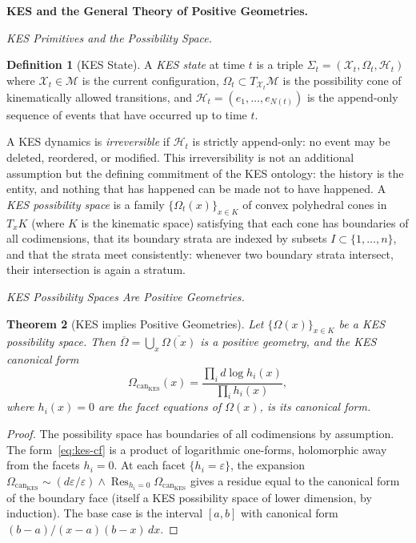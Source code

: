 \documentclass[12pt, oneside]{amsart}
\theoremstyle{plain}
\newtheorem{theorem}{Theorem}[section]
\theoremstyle{definition}
\newtheorem{definition}[theorem]{Definition}
\theoremstyle{remark}
\DeclareMathOperator{\Res}{Res}
\newcommand{\eps}{\varepsilon}
\newcommand{\XKS}{\mathcal{X}}
\newcommand{\OmKS}{\Omega}
\newcommand{\HKS}{\mathcal{H}}
\newcommand{\CF}{\Omega_{\mathrm{can}}}
\begin{document}
\bigskip\noindent\textbf{KES and the General Theory of Positive Geometries.}
\label{sec:kes}

\medskip\noindent\textit{KES Primitives and the Possibility Space.}

\begin{definition}[KES State]
A \emph{KES state} at time $t$ is a triple $\Sigma_t = (\XKS_t, \OmKS_t, \HKS_t)$ where $\XKS_t \in \mathcal{M}$ is the current configuration, $\OmKS_t \subset T_{\XKS_t}\mathcal{M}$ is the possibility cone of kinematically allowed transitions, and $\HKS_t = (e_1, \ldots, e_{N(t)})$ is the append-only sequence of events that have occurred up to time $t$.
\end{definition}

A KES dynamics is \emph{irreversible} if $\HKS_t$ is strictly append-only: no event may be deleted, reordered, or modified. This irreversibility is not an additional assumption but the defining commitment of the KES ontology: the history is the entity, and nothing that has happened can be made not to have happened. A \emph{KES possibility space} is a family $\{\OmKS_t(x)\}_{x \in K}$ of convex polyhedral cones in $T_x K$ (where $K$ is the kinematic space) satisfying that each cone has boundaries of all codimensions, that its boundary strata are indexed by subsets $I \subset \{1,\ldots,n\}$, and that the strata meet consistently: whenever two boundary strata intersect, their intersection is again a stratum.

\medskip\noindent\textit{KES Possibility Spaces Are Positive Geometries.}

\begin{theorem}[KES implies Positive Geometries]
\label{thm:kes-pg}
Let $\{\OmKS(x)\}_{x \in K}$ be a KES possibility space. Then $\overline{\OmKS} = \bigcup_{x} \overline{\OmKS(x)}$ is a positive geometry, and the KES canonical form
\begin{equation}
\label{eq:kes-cf}
  \CF_{\mathrm{KES}}(x) = \frac{\prod_i d\log h_i(x)}{\prod_i h_i(x)},
\end{equation}
where $h_i(x) = 0$ are the facet equations of $\OmKS(x)$, is its canonical form.
\end{theorem}

\begin{proof}
The possibility space has boundaries of all codimensions by assumption. The form~\eqref{eq:kes-cf} is a product of logarithmic one-forms, holomorphic away from the facets $h_i = 0$. At each facet $\{h_i = \eps\}$, the expansion $\CF_{\mathrm{KES}} \sim (d\eps/\eps) \wedge \Res_{h_i = 0}\CF_{\mathrm{KES}}$ gives a residue equal to the canonical form of the boundary face (itself a KES possibility space of lower dimension, by induction). The base case is the interval $[a,b]$ with canonical form $(b-a)/(x-a)(b-x) \, dx$.
\end{proof}
\end{document}
